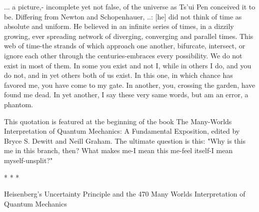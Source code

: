            ... a picture,- incomplete yet not false, of the universe as Ts'ui Pen
   conceived it to be. Differing from Newton and Schopenhauer, ..: [he] did not
   think of time as absolute and uniform. He believed in an infinite series of times,
   in a dizzily growing, ever spreading network of diverging, converging and
   parallel times. This web of time-the strands of which approach one another,
   bifurcate, intersect, or ignore each other through the centuries-embraces every
   possibility. We do not exist in most of them. In some you exist and not I, while
   in others I do, and you do not, and in yet others both of us exist. In this one, in
   which chance has favored me, you have come to my gate. In another, you,
   crossing the garden, have found me dead. In yet another, I say these very same
   words, but am an error, a phantom.

This quotation is featured at the beginning of the book The Many-Worlds
Interpretation of Quantum Mechanics: A Fundamental Exposition, edited by Bryce S.
Dewitt and Neill Graham. The ultimate question is this: "Why is this me in this
branch, then? What makes me-I mean this me-feel itself-I mean myself-unsplit?"

                                        *   *   *




Heisenberg's Uncertainty Principle and the                                             470
Many Worlds Interpretation of Quantum Mechanics

